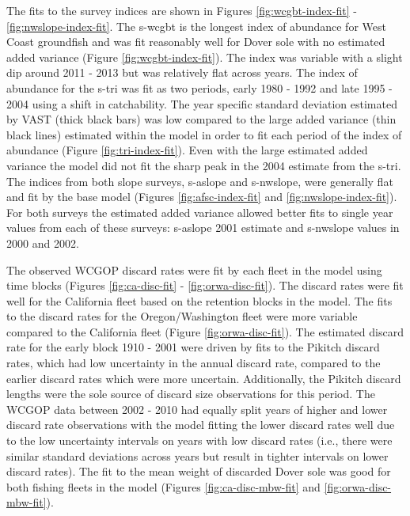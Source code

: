 \documentclass[11pt,
  english,
  a4paper,
]{article}
\begin{document}
\leavevmode\tagmcend\tagstructend\par


The fits to the survey indices are shown in Figures \ref{fig:wcgbt-index-fit} - \ref{fig:nwslope-index-fit}. The \gls{s-wcgbt} is the longest index of abundance for West Coast groundfish and was fit reasonably well for Dover sole with no estimated added variance (Figure \ref{fig:wcgbt-index-fit}). The index was variable with a slight dip around 2011 - 2013 but was relatively flat across years. The index of abundance for the \gls{s-tri} was fit as two periods, early 1980 - 1992 and late 1995 - 2004 using a shift in catchability. The year specific standard deviation estimated by VAST (thick black bars) was low compared to the large added variance (thin black lines) estimated within the model in order to fit each period of the index of abundance (Figure \ref{fig:tri-index-fit}). Even with the large estimated added variance the model did not fit the sharp peak in the 2004 estimate from the \gls{s-tri}. The indices from both slope surveys, \gls{s-aslope} and \gls{s-nwslope}, were generally flat and fit by the base model (Figures \ref{fig:afsc-index-fit} and \ref{fig:nwslope-index-fit}). For both surveys the estimated added variance allowed better fits to single year values from each of these surveys: \gls{s-aslope} 2001 estimate and \gls{s-nwslope} values in 2000 and 2002.

\leavevmode\tagmcend\tagstructend\par


The observed WCGOP discard rates were fit by each fleet in the model using time blocks (Figures \ref{fig:ca-disc-fit} - \ref{fig:orwa-disc-fit}). The discard rates were fit well for the California fleet based on the retention blocks in the model. The fits to the discard rates for the Oregon/Washington fleet were more variable compared to the California fleet (Figure \ref{fig:orwa-disc-fit}). The estimated discard rate for the early block 1910 - 2001 were driven by fits to the Pikitch discard rates, which had low uncertainty in the annual discard rate, compared to the earlier discard rates which were more uncertain. Additionally, the Pikitch discard lengths were the sole source of discard size observations for this period. The WCGOP data between 2002 - 2010 had equally split years of higher and lower discard rate observations with the model fitting the lower discard rates well due to the low uncertainty intervals on years with low discard rates (i.e., there were similar standard deviations across years but result in tighter intervals on lower discard rates). The fit to the mean weight of discarded Dover sole was good for both fishing fleets in the model (Figures \ref{fig:ca-disc-mbw-fit} and \ref{fig:orwa-disc-mbw-fit}).
\end{document}
